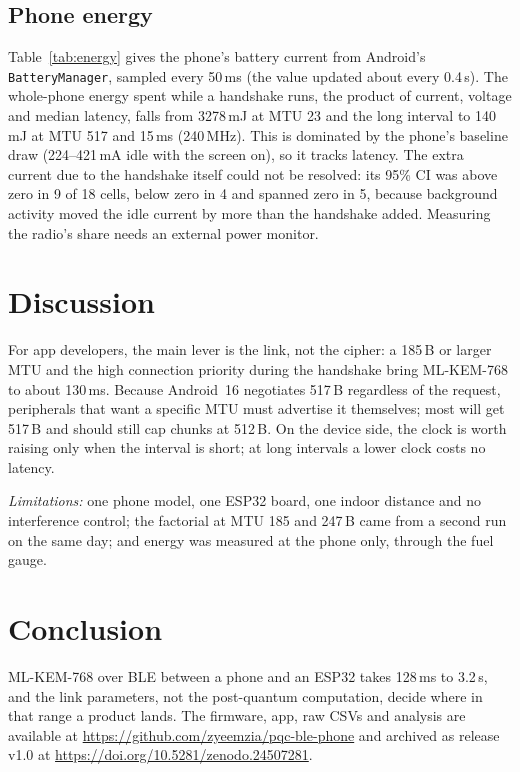 \documentclass[journal]{IEEEtran}
\begin{document}
\subsection{Phone energy}
Table~\ref{tab:energy} gives the phone's battery current from Android's
\texttt{BatteryManager}, sampled every 50\,ms (the value updated about every
0.4\,s). The whole-phone energy spent while a handshake runs, the product of
current, voltage and median latency, falls from 3278\,mJ at MTU 23 and the
long interval to 140\,mJ at MTU 517 and 15\,ms (240\,MHz). This is dominated
by the phone's baseline draw (224--421\,mA idle with the screen on), so it
tracks latency. The extra current due to the handshake itself could not be
resolved: its 95\% CI was above zero in 9 of 18 cells, below zero in 4 and
spanned zero in 5, because background activity moved the idle current by
more than the handshake added. Measuring the radio's share needs an external
power monitor.

\begin{table}[t]
\centering
\caption{Phone battery current and whole-phone energy per handshake at
240\,MHz. $\Delta I$: handshake minus idle current, block-bootstrap 95\% CI.}
\label{tab:energy}
\footnotesize
\setlength{\tabcolsep}{3pt}

\end{table}

\section{Discussion}
For app developers, the main lever is the link, not the cipher: a 185\,B or
larger MTU and the high connection priority during the handshake bring
ML-KEM-768 to about 130\,ms. Because Android~16 negotiates 517\,B regardless of the request,
peripherals that want a specific MTU must advertise it themselves; most will
get 517\,B and should still cap chunks at 512\,B. On the device side, the
clock is worth raising only when the interval is short; at long intervals a
lower clock costs no latency.

\textit{Limitations:} one phone model, one ESP32 board, one indoor distance
and no interference control; the factorial at MTU 185 and 247\,B came from a
second run on the same day; and energy was measured at the phone only,
through the fuel gauge.

\section{Conclusion}
ML-KEM-768 over BLE between a phone and an ESP32 takes 128\,ms to 3.2\,s,
and the link parameters, not the post-quantum computation, decide where in
that range a product lands. The firmware, app, raw CSVs and analysis are
available at \url{https://github.com/zyeemzia/pqc-ble-phone} and archived
as release v1.0 at \url{https://doi.org/10.5281/zenodo.24507281}.
\end{document}
